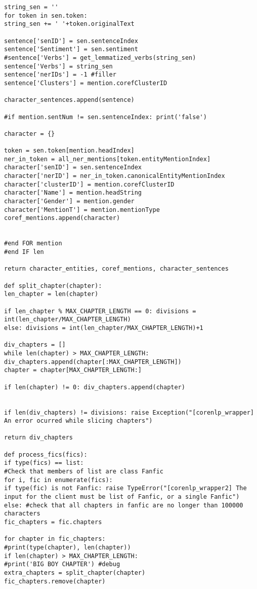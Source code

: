 \documentclass{pre-tfg}
\begin{document}
\begin{lstlisting}[style=consola]
string_sen = ''
for token in sen.token: 
string_sen += ' '+token.originalText

sentence['senID'] = sen.sentenceIndex
sentence['Sentiment'] = sen.sentiment
#sentence['Verbs'] = get_lemmatized_verbs(string_sen)
sentence['Verbs'] = string_sen
sentence['nerIDs'] = -1 #filler
sentence['Clusters'] = mention.corefClusterID

character_sentences.append(sentence)

#if mention.sentNum != sen.sentenceIndex: print('false')

character = {}

token = sen.token[mention.headIndex]
ner_in_token = all_ner_mentions[token.entityMentionIndex]
character['senID'] = sen.sentenceIndex
character['nerID'] = ner_in_token.canonicalEntityMentionIndex
character['clusterID'] = mention.corefClusterID
character['Name'] = mention.headString
character['Gender'] = mention.gender
character['MentionT'] = mention.mentionType
coref_mentions.append(character)


#end FOR mention
#end IF len		

return character_entities, coref_mentions, character_sentences

def split_chapter(chapter):
len_chapter = len(chapter)

if len_chapter % MAX_CHAPTER_LENGTH == 0: divisions = int(len_chapter/MAX_CHAPTER_LENGTH)
else: divisions = int(len_chapter/MAX_CHAPTER_LENGTH)+1

div_chapters = []
while len(chapter) > MAX_CHAPTER_LENGTH:
div_chapters.append(chapter[:MAX_CHAPTER_LENGTH])
chapter = chapter[MAX_CHAPTER_LENGTH:]

if len(chapter) != 0: div_chapters.append(chapter)


if len(div_chapters) != divisions: raise Exception("[corenlp_wrapper] An error ocurred while slicing chapters")

return div_chapters

def process_fics(fics):
if type(fics) == list:
#Check that members of list are class Fanfic
for i, fic in enumerate(fics):
if type(fic) is not Fanfic: raise TypeError("[corenlp_wrapper2] The input for the client must be list of Fanfic, or a single Fanfic")
else: #check that all chapters in fanfic are no longer than 100000 characters
fic_chapters = fic.chapters

for chapter in fic_chapters:
#print(type(chapter), len(chapter))
if len(chapter) > MAX_CHAPTER_LENGTH:
#print('BIG BOY CHAPTER') #debug
extra_chapters = split_chapter(chapter)
fic_chapters.remove(chapter)


\end{lstlisting}
\end{document}
